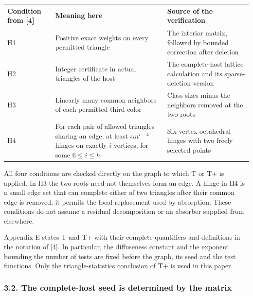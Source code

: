 \documentclass[english,11pt,a4paper]{article}
\begin{document}
{\begin{longtable}[]{@{}
  >{\raggedright\arraybackslash}p{}
  >{\raggedright\arraybackslash}p{}
  >{\raggedright\arraybackslash}p{}@{}}
\toprule\noalign{}
\begin{minipage}[b]{\linewidth}\raggedright
Condition from {[}4{]}
\end{minipage} & \begin{minipage}[b]{\linewidth}\raggedright
Meaning here
\end{minipage} & \begin{minipage}[b]{\linewidth}\raggedright
Source of the verification
\end{minipage} \\
\midrule\noalign{}
\endhead
\bottomrule\noalign{}
\endlastfoot
H1 & Positive exact weights on every permitted triangle & The interior matrix, followed by bounded correction after deletion \\
H2 & Integer certificate in actual triangles of the host & The complete-host lattice calculation and its sparse-deletion version \\
H3 & Linearly many common neighbors of each permitted third color & Class sizes minus the neighbors removed at the two roots \\
H4 & For each pair of allowed triangles sharing an edge, at least \(\alpha n^{i-4}\) hinges on exactly \(i\) vertices, for some \(6\le i\le h\) & Six-vertex octahedral hinges with two freely selected points \\
\end{longtable}
}

All four conditions are checked directly on the graph to which T or T+ is applied. In H3 the two roots need not themselves form an edge. A hinge in H4 is a small edge set that can complete either of two triangles after their common edge is removed; it permits the local replacement used by absorption. These conditions do not assume a residual decomposition or an absorber supplied from elsewhere.

Appendix E states T and T+ with their complete quantifiers and definitions in the notation of {[}4{]}. In particular, the diffuseness constant and the exponent bounding the number of tests are fixed before the graph, its seed and the test functions. Only the triangle-statistics conclusion of T+ is used in this paper.

\subsubsection{3.2. The complete-host seed is determined by the matrix}\label{the-complete-host-seed-is-determined-by-the-matrix}
\end{document}
